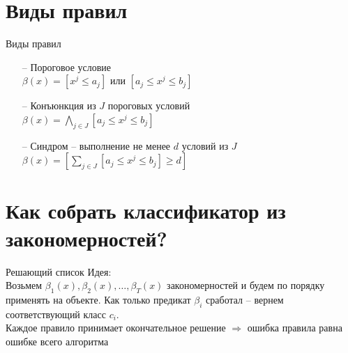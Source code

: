 \documentclass[10pt]{beamer}
\begin{document}
\section{Виды правил}

\begin{frame}{Виды правил}
	\begin{itemize} [<+->]
	\item[--] Пороговое условие\\
	$\beta(x) = \left[x^j \leq a_j \right]$ или  $\left[a_j \leq x^j \leq b_j \right]$
	\item[--] Конъюнкция из $J$ пороговых условий \\
	$\beta(x) = \bigwedge\limits_{j \in J} \left[a_j \leq x^j \leq b_j \right]$
	\item[--] Синдром -- выполнение не менее $d$ условий из $J$
	$\beta(x) = \left[\sum\limits_{j \in J} \left[a_j \leq x^j \leq b_j \right] \geq d \right]$
	\end{itemize}
\end{frame}

\section{Как собрать классификатор из закономерностей?}

\begin{frame}{Решающий список}
	\alert{Идея}:\\
	Возьмем $\beta_1(x), \beta_2(x), \dots, \beta_T(x)$ закономерностей и будем по порядку применять на объекте. 
	Как только предикат $\beta_i$ сработал -- вернем соответствующий класс $c_i$.\\
	\bigbreak
	\pause
	Каждое правило принимает окончательное решение $\Rightarrow$ ошибка правила равна ошибке всего алгоритма
\end{frame}
\end{document}

